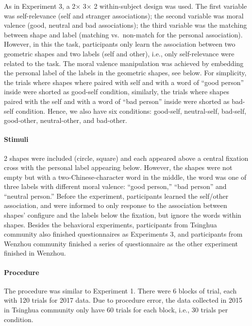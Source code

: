 \documentclass[
  english,
  man]{apa6}
\let\oldparagraph\paragraph
\renewcommand{\paragraph}[1]{\oldparagraph{#1}\mbox{}}
\begin{document}
As in Experiment 3, a 2× 3× 2 within-subject design was used. The first variable was self-relevance (self and stranger associations); the second variable was moral valence (good, neutral and bad associations); the third variable was the matching between shape and label (matching vs.~non-match for the personal association).
However, in this the task, participants only learn the association between two geometric shapes and two labels (self and other), i.e., only self-relevance were related to the task. The moral valence manipulation was achieved by embedding the personal label of the labels in the geometric shapes, see below. For simplicity, the trials where shapes where paired with self and with a word of ``good person'' inside were shorted as good-self condition, similarly, the trials where shapes paired with the self and with a word of ``bad person'' inside were shorted as bad-self condition. Hence, we also have six conditions: good-self, neutral-self, bad-self, good-other, neutral-other, and bad-other.

\hypertarget{stimuli-5}{%
\paragraph{Stimuli}\label{stimuli-5}}

2 shapes were included (circle, square) and each appeared above a central fixation cross with the personal label appearing below. However, the shapes were not empty but with a two-Chinese-character word in the middle, the word was one of three labels with different moral valence: ``good person,'' ``bad person'' and ``neutral person.'' Before the experiment, participants learned the self/other association, and were informed to only response to the association between shapes' configure and the labels below the fixation, but ignore the words within shapes. Besides the behavioral experiments, participants from Tsinghua community also finished questionnaires as Experiments 3, and participants from Wenzhou community finished a series of questionnaire as the other experiment finished in Wenzhou.

\hypertarget{procedure-9}{%
\paragraph{Procedure}\label{procedure-9}}

The procedure was similar to Experiment 1. There were 6 blocks of trial, each with 120 trials for 2017 data. Due to procedure error, the data collected in 2015 in Tsinghua community only have 60 trials for each block, i.e., 30 trials per condition.
\end{document}
